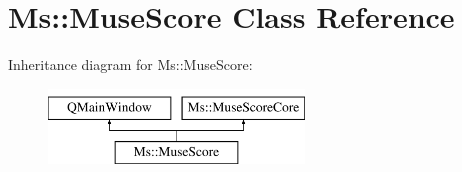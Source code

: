 \hypertarget{class_ms_1_1_muse_score}{}\section{Ms\+:\+:Muse\+Score Class Reference}
\label{class_ms_1_1_muse_score}
Inheritance diagram for Ms\+:\+:Muse\+Score\+:\begin{figure}[H]
\begin{center}
\leavevmode
\includegraphics[height=2.000000cm]{class_ms_1_1_muse_score}
\end{center}
\end{figure}
